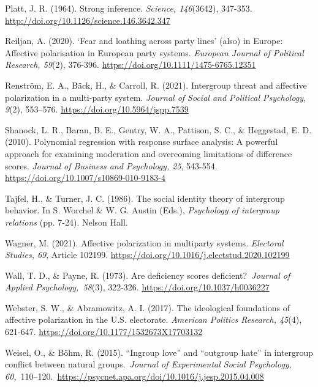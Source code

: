 \documentclass[authordate, meta, issue]{jote-new-article}
\begin{document}
	Platt, J. R. (1964). Strong inference. \emph{Science, 146}(3642), 347-353. \url{http://doi.org/10.1126/science.146.3642.347}



	Reiljan, A. (2020). ‘Fear and loathing across party lines' (also) in Europe: Affective polarisation in European party systems. \emph{European Journal of Political Research, 59}(2), 376-396. \url{https://doi.org/10.1111/1475-6765.12351}



	Renström, E. A., Bäck, H., \& Carroll, R. (2021). Intergroup threat and affective polarization in a multi-party system. \emph{Journal of Social and Political Psychology, 9}(2), 553--576. \url{https://doi.org/10.5964/jspp.7539}



	Shanock, L. R., Baran, B. E., Gentry, W. A., Pattison, S. C., \& Heggestad, E. D. (2010). Polynomial regression with response surface analysis: A powerful approach for examining moderation and overcoming limitations of difference scores. \emph{Journal of Business and Psychology, 25}, 543-554. \url{https://doi.org/10.1007/s10869-010-9183-4}



	Tajfel, H., \& Turner, J. C. (1986). The social identity theory of intergroup behavior. In S. Worchel \& W. G. Austin (Eds.), \emph{Psychology of intergroup relations} (pp. 7-24). Nelson Hall.



	Wagner, M. (2021). Affective polarization in multiparty systems. \emph{Electoral Studies, 69}, Article 102199. \url{https://doi.org/10.1016/j.electstud.2020.102199}



	Wall, T. D., \& Payne, R. (1973). Are deficiency scores deficient?\emph{ Journal of Applied Psychology, 58}(3), 322-326. \url{https://doi.org/10.1037/h0036227}



	Webster, S. W., \& Abramowitz, A. I. (2017). The ideological foundations of affective polarization in the U.S. electorate. \emph{American Politics Research, 45}(4), 621-647. \url{https://doi.org/10.1177/1532673X17703132}



	Weisel, O., \& Böhm, R. (2015). “Ingroup love” and “outgroup hate” in intergroup conflict between natural groups. \emph{Journal of Experimental Social Psychology, 60,} 110--120. \url{https://psycnet.apa.org/doi/10.1016/j.jesp.2015.04.008}
\end{document}
